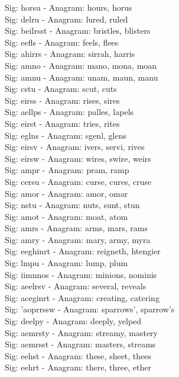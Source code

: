 Sig: {horsu} - Anagram: hours, horus \\
Sig: {delru} - Anagram: lured, ruled \\
Sig: {beilrsst} - Anagram: bristles, blisters \\
Sig: {eefls} - Anagram: feels, flees \\
Sig: {ahirrs} - Anagram: sirrah, harris \\
Sig: {amno} - Anagram: mano, mona, moan \\
Sig: {amnu} - Anagram: unam, maun, manu \\
Sig: {cstu} - Anagram: scut, cuts \\
Sig: {eirss} - Anagram: rises, sires \\
Sig: {aellps} - Anagram: palles, lapels \\
Sig: {eirst} - Anagram: tries, rites \\
Sig: {eglns} - Anagram: sgenl, glens \\
Sig: {eirsv} - Anagram: ivers, servi, rives \\
Sig: {eirsw} - Anagram: wires, swire, weirs \\
Sig: {ampr} - Anagram: pram, ramp \\
Sig: {cersu} - Anagram: curse, cures, cruse \\
Sig: {amor} - Anagram: amor, omar \\
Sig: {nstu} - Anagram: nuts, sunt, stun \\
Sig: {amot} - Anagram: moat, atom \\
Sig: {amrs} - Anagram: arms, mars, rams \\
Sig: {amry} - Anagram: mary, army, myra \\
Sig: {eeghinrt} - Anagram: reigneth, htengier \\
Sig: {lmpu} - Anagram: lump, plum \\
Sig: {iimnnos} - Anagram: minions, nominis \\
Sig: {aeelrsv} - Anagram: several, reveals \\
Sig: {aceginrt} - Anagram: creating, catering \\
Sig: {'aoprrssw} - Anagram: sparrows', sparrow's \\
Sig: {deelpy} - Anagram: deeply, yelped \\
Sig: {aemrsty} - Anagram: streamy, mastery \\
Sig: {aemrsst} - Anagram: masters, streams \\
Sig: {eehst} - Anagram: these, sheet, thees \\
Sig: {eehrt} - Anagram: there, three, ether \\
